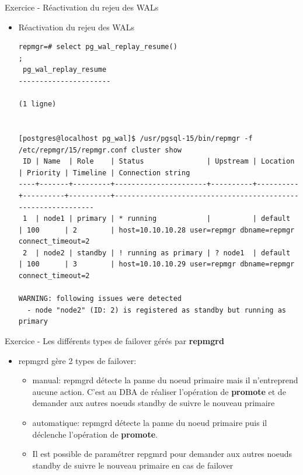 \begin{frame}[fragile]{Exercice - Réactivation du rejeu des WALs}

   \begin{itemize}
      \item Réactivation du rejeu des WALs
\begin{tiny}
\begin{Verbatim}[commandchars=\&\{\}]
repmgr=# select pg_wal_replay_resume()
;
 pg_wal_replay_resume
----------------------

(1 ligne)


[postgres@localhost pg_wal]$ /usr/pgsql-15/bin/repmgr -f /etc/repmgr/15/repmgr.conf cluster show                                                                                             
 ID | Name  | Role    | Status               | Upstream | Location | Priority | Timeline | Connection string                                                                                 
----+-------+---------+----------------------+----------+----------+----------+----------+--------------------------------------------------------------                                     
 1  | node1 | primary | * running            |          | default  | 100      | 2        | host=10.10.10.28 user=repmgr dbname=repmgr connect_timeout=2                                      
 2  | node2 | standby | ! running as primary | ? node1  | default  | 100      | 3        | host=10.10.10.29 user=repmgr dbname=repmgr connect_timeout=2                                      

WARNING: following issues were detected
  - node "node2" (ID: 2) is registered as standby but running as primary
\end{Verbatim}
\end{tiny}
   \end{itemize}

\end{frame}


\begin{frame}[fragile]{Exercice - Les différents types de failover gérés par \textbf{repmgrd}}

   \begin{itemize}
      \item repmgrd gère 2 types de failover:
      \begin{itemize}
         \item manual: repmgrd détecte la panne du noeud primaire mais il n'entreprend aucune action. C'est au DBA de réaliser l'opération de \textbf{promote} et de demander aux autres noeuds standby de suivre le nouveau primaire
         \item automatique: repmgrd détecte la panne du noeud primaire puis il déclenche l'opération de \textbf{promote}.
         \item Il est possible de paramétrer repgmrd pour demander aux autres noeuds standby de suivre le nouveau primaire en cas de failover
      \end{itemize}
   \end{itemize}

\end{frame}

